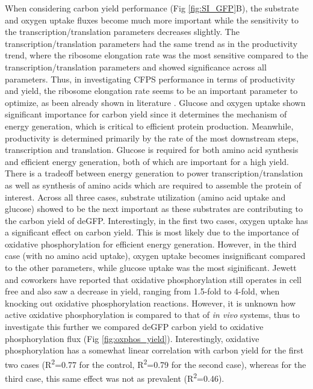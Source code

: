 \documentclass[journal=asbcd6,manuscript=article]{achemso}
\begin{document}
When considering carbon yield performance (Fig \ref{fig:SI_GFP}B), the substrate and oxygen uptake fluxes become much more important while the sensitivity to the transcription/translation parameters decreases slightly.
The transcription/translation parameters had the same trend as in the productivity trend, where the ribosome elongation rate was the most sensitive compared to the transcription/translation parameters and showed significance across all parameters. 
Thus, in investigating CFPS performance in terms of productivity and yield, the ribosome elongation rate seems to be an important parameter to optimize, as been already shown in literature \cite{2005_underwood_biotech, 2014_li_PlosOne}. 
Glucose and oxygen uptake shown significant importance for carbon yield since it determines the mechanism of energy generation, which is critical to efficient protein production.
Meanwhile, productivity is determined primarily by the rate of the most downstream steps, transcription and translation.
Glucose is required for both amino acid synthesis and efficient energy generation, both of which are important for a high yield.
There is a tradeoff between energy generation to power transcription/translation as well as synthesis of amino acids which are required to assemble the protein of interest. 
Across all three cases, substrate utilization (amino acid uptake and glucose) showed to be the next important as these substrates are contributing to the carbon yield of deGFP.
Interestingly, in the first two cases, oxygen uptake has a significant effect on carbon yield.
This is most likely due to the importance of oxidative phosphorylation for efficient energy generation.
However, in the third case (with no amino acid uptake), oxygen uptake becomes insignificant compared to the other parameters, while glucose uptake was the most siginificant.
Jewett and coworkers have reported that oxidative phosphorylation still operates in cell free and also saw a decrease in yield, ranging from 1.5-fold to 4-fold, when knocking out oxidative phosphorylation reactions\cite{Jewett:2008aa}.
However, it is unknown how active oxidative phosphorylation is compared to that of \textit{in vivo} systems, thus to investigate this further we compared deGFP carbon yield to oxidative phosphorylation flux (Fig \ref{fig:oxphos_yield}).
Interestingly, oxidative phosphorylation has a somewhat linear correlation with carbon yield for the first two cases (R\textsuperscript{2}=0.77 for the control, R\textsuperscript{2}=0.79 for the second case), whereas for the third case, this same effect was not as prevalent (R\textsuperscript{2}=0.46). 
\end{document}
